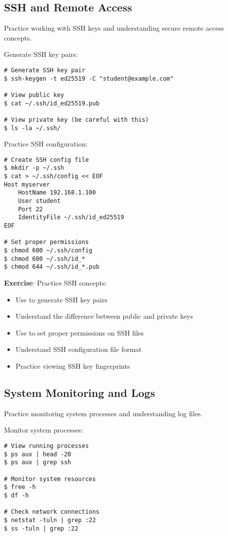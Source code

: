 \subsection{SSH and Remote Access}

Practice working with SSH keys and understanding secure remote access concepts.

Generate SSH key pairs:

\begin{lstlisting}[style=bashstyle]
# Generate SSH key pair
$ ssh-keygen -t ed25519 -C "student@example.com"

# View public key
$ cat ~/.ssh/id_ed25519.pub

# View private key (be careful with this)
$ ls -la ~/.ssh/
\end{lstlisting}

Practice SSH configuration:

\begin{lstlisting}[style=bashstyle]
# Create SSH config file
$ mkdir -p ~/.ssh
$ cat > ~/.ssh/config << EOF
Host myserver
    HostName 192.168.1.100
    User student
    Port 22
    IdentityFile ~/.ssh/id_ed25519
EOF

# Set proper permissions
$ chmod 600 ~/.ssh/config
$ chmod 600 ~/.ssh/id_*
$ chmod 644 ~/.ssh/id_*.pub
\end{lstlisting}

\textbf{Exercise}: Practice SSH concepts:
\begin{itemize}
    \item Use  to generate SSH key pairs
    \item Understand the difference between public and private keys
    \item Use  to set proper permissions on SSH files
    \item Understand SSH configuration file format
    \item Practice viewing SSH key fingerprints
\end{itemize}

\subsection{System Monitoring and Logs}

Practice monitoring system processes and understanding log files.

Monitor system processes:

\begin{lstlisting}[style=bashstyle]
# View running processes
$ ps aux | head -20
$ ps aux | grep ssh

# Monitor system resources
$ free -h
$ df -h

# Check network connections
$ netstat -tuln | grep :22
$ ss -tuln | grep :22
\end{lstlisting}

